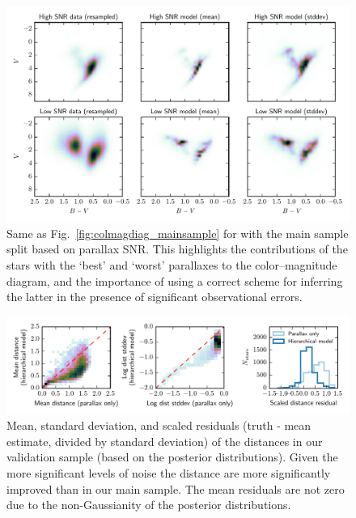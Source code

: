 \documentclass[manuscript, letterpaper]{aastex6}
\newcommand{\figref}[1]{{\xspace}Fig.~\ref{#1}}
\begin{document}
\begin{figure}
\hspace*{-4mm}\includegraphics[width=15.9cm]{colmagdiag_othersamples.pdf}
\caption{Same as \figref{fig:colmagdiag_mainsample} for with the main sample split based on parallax SNR. This highlights the contributions of the stars with the `best' and `worst' parallaxes to the color--magnitude diagram, and the importance of using a correct scheme for inferring the latter in the presence of significant observational errors.}
\label{fig:colmagdiag_othersamples}
\end{figure}

\begin{figure}
\hspace*{-3mm}\includegraphics[width=16cm]{cv_metrics.pdf}
\caption{Mean, standard deviation, and scaled residuals (truth - mean estimate, divided by standard deviation) of the distances in our validation sample (based on the posterior distributions).
Given the more significant levels of noise the distance are more significantly improved than in our main sample. 
The mean residuals are not zero due to the non-Gaussianity of the posterior distributions.}
\label{fig:cv_metrics}
\end{figure}
\end{document}
